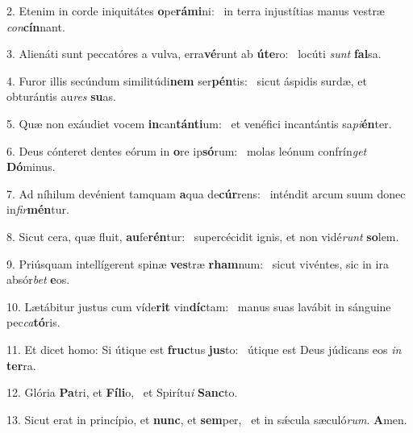 2. Etenim in corde iniquitátes \textbf{o}pe\textbf{rá}\textbf{mi}ni: \ast\  in terra injustítias manus vestræ \textit{con}\textbf{cín}nant.\

3. Alienáti sunt peccatóres a vulva, erra\textbf{vé}runt ab \textbf{ú}\textbf{te}ro: \ast\  locúti \textit{sunt} \textbf{fal}sa.\

4. Furor illis secúndum similitúdi\textbf{nem} ser\textbf{pén}tis: \ast\  sicut áspidis surdæ, et obturántis au\textit{res} \textbf{su}as.\

5. Quæ non exáudiet vocem \textbf{in}can\textbf{tán}\textbf{ti}um: \ast\  et venéfici incantántis sa\textit{pi}\textbf{én}ter.\

6. Deus cónteret dentes eórum in \textbf{o}re ip\textbf{só}rum: \ast\  molas leónum confrín\textit{get} \textbf{Dó}minus.\

7. Ad níhilum devénient tamquam \textbf{a}qua de\textbf{cúr}rens: \ast\  inténdit arcum suum donec in\textit{fir}\textbf{mén}tur.\

8. Sicut cera, quæ fluit, \textbf{au}fe\textbf{rén}tur: \ast\  supercécidit ignis, et non vidé\textit{runt} \textbf{so}lem.\

9. Priúsquam intellígerent spinæ \textbf{ves}træ \textbf{rham}num: \ast\  sicut vivéntes, sic in ira absór\textit{bet} \textbf{e}os.\

10. Lætábitur justus cum víde\textbf{rit} vin\textbf{díc}tam: \ast\  manus suas lavábit in sánguine pec\textit{ca}\textbf{tó}ris.\

11. Et dicet homo: Si útique est \textbf{fruc}tus \textbf{jus}to: \ast\  útique est Deus júdicans eos \textit{in} \textbf{ter}ra.\

12. Glória \textbf{Pa}tri, et \textbf{Fí}\textbf{li}o, \ast\  et Spirítu\textit{i} \textbf{Sanc}to.\

13. Sicut erat in princípio, et \textbf{nunc}, et \textbf{sem}per, \ast\  et in sǽcula sæculó\textit{rum}. \textbf{A}men.\

